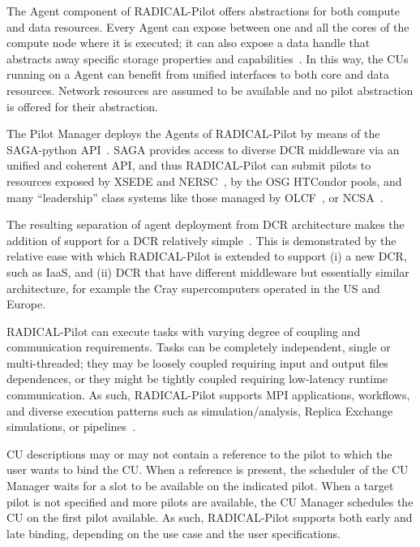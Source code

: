 \documentclass{sig-alternate}
\begin{document}


The Agent component of RADICAL-Pilot offers abstractions for both compute and
data resources. Every Agent can expose between one and all the cores of the
compute node where it is executed; it can also expose a data handle that
abstracts away specific storage properties and capabilities~\cite{luckow2010}.
In this way, the CUs running on a Agent can benefit from unified interfaces to
both core and data resources. Network resources are assumed to be available and
no pilot abstraction is offered for their abstraction.

The Pilot Manager deploys the Agents of RADICAL-Pilot by means of the
SAGA-python API~\cite{merzky2015saga}. SAGA provides access to diverse DCR
middleware via an unified and coherent API, and thus RADICAL-Pilot can submit
pilots to resources exposed by XSEDE and NERSC~\cite{nersc_url}, by the OSG
HTCondor pools, and many ``leadership'' class systems like those managed by
OLCF~\cite{olcf_url}, or NCSA~\cite{ncsa_url}.

The resulting separation of agent deployment from DCR architecture makes the
addition of support for a DCR relatively simple~\cite{merzky2015radical}. This is
demonstrated by the relative ease with which RADICAL-Pilot is extended to
support (i) a new DCR, such as IaaS, and (ii) DCR that have different middleware
but essentially similar architecture, for example the Cray supercomputers
operated in the US and Europe.

RADICAL-Pilot can execute tasks with varying degree of coupling and
communication requirements. Tasks can be completely independent, single or
multi-threaded; they may be loosely coupled requiring input and output files
dependences, or they might be tightly coupled requiring low-latency runtime
communication. As such, RADICAL-Pilot supports MPI applications, workflows, and
diverse execution patterns such as simulation/analysis, Replica Exchange
simulations, or pipelines~\cite{emdtoolkit_url}.

CU descriptions may or may not contain a reference to the pilot to which the
user wants to bind the CU. When a reference is present, the scheduler of the CU
Manager waits for a slot to be available on the indicated pilot. When a target
pilot is not specified and more pilots are available, the CU Manager schedules
the CU on the first pilot available. As such, RADICAL-Pilot supports both early
and late binding, depending on the use case and the user specifications.
\end{document}

